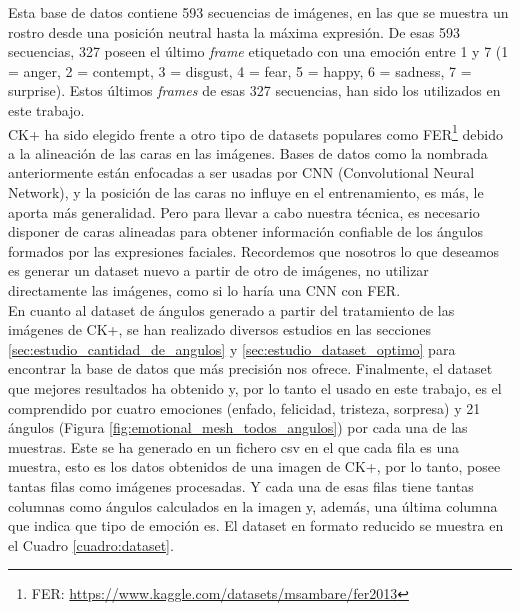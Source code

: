 Esta base de datos contiene 593 secuencias de imágenes, en las que se muestra un rostro desde una posición neutral hasta la máxima expresión. De esas 593 secuencias, 327 poseen el último \textit{frame} etiquetado con una emoción entre 1 y 7 (1 = anger, 2 = contempt, 3 = disgust, 4 = fear, 5 = happy, 6 = sadness, 7 = surprise). Estos últimos \textit{frames} de esas 327 secuencias, han sido los utilizados en este trabajo.\\

CK+ ha sido elegido frente a otro tipo de datasets populares como FER\footnote{FER: \url{https://www.kaggle.com/datasets/msambare/fer2013}} debido a la alineación de las caras en las imágenes. Bases de datos como la nombrada anteriormente están enfocadas a ser usadas por CNN (Convolutional Neural Network), y la posición de las caras no influye en el entrenamiento, es más, le aporta más generalidad. Pero para llevar a cabo nuestra técnica, es necesario disponer de caras alineadas para obtener información confiable de los ángulos formados por las expresiones faciales. Recordemos que nosotros lo que deseamos es generar un dataset nuevo a partir de otro de imágenes, no utilizar directamente las imágenes, como si lo haría una CNN con FER.\\

En cuanto al dataset de ángulos generado a partir del tratamiento de las imágenes de CK+, se han realizado diversos estudios en las secciones \ref{sec:estudio_cantidad_de_angulos} y \ref{sec:estudio_dataset_optimo} para encontrar la base de datos que más precisión nos ofrece. Finalmente, el dataset que mejores resultados ha obtenido y, por lo tanto el usado en este trabajo, es el comprendido por cuatro emociones (enfado, felicidad, tristeza, sorpresa) y 21 ángulos (Figura \ref{fig:emotional_mesh_todos_angulos}) por cada una de las muestras. Este se ha generado en un fichero csv en el que cada fila es una muestra, esto es los datos obtenidos de una imagen de CK+, por lo tanto, posee tantas filas como imágenes procesadas. Y cada una de esas filas tiene tantas columnas como ángulos calculados en la imagen y, además, una última columna que indica que tipo de emoción es. El dataset en formato reducido se muestra en el Cuadro \ref{cuadro:dataset}.\\

